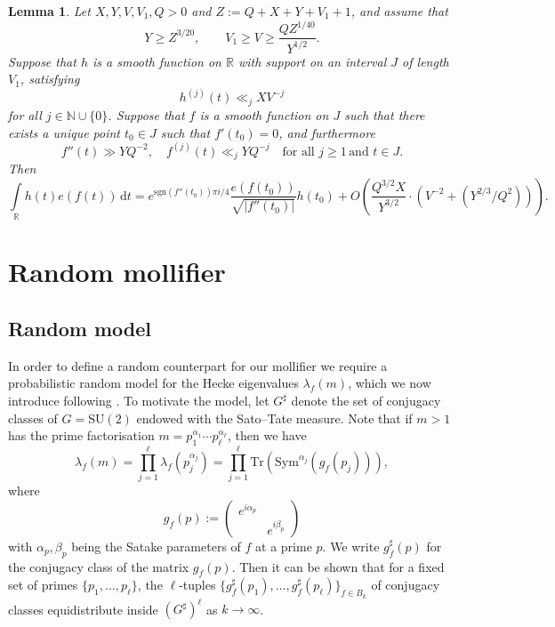 \documentclass[a4paper,10pt,twoside]{amsart}
\newtheorem{lemma}[theorem]{Lemma}
\theoremstyle{definition}
\numberwithin{equation}{section}
\newcommand\R{\mathbb{R}}
\renewcommand\:{\colon}
\begin{document}
\begin{lemma}\label{saddle-point}
Let $X,Y,V,V_1,Q>0$ and $Z:=Q+X+Y+V_1+1$, and assume that
\[Y\geq Z^{3/20}, \qquad V_1\geq V\geq\frac{QZ^{1/40}}{Y^{1/2}}.\]
Suppose that $h$ is a smooth function on $\mathbb R$ with support on an interval $J$ of length $V_1$, satisfying
\[h^{(j)}(t)\ll_j XV^{-j}\]
for all $j\in\mathbb N\cup\{0\}$. Suppose that $f$ is a smooth function on $J$ such that there exists a unique point $t_0\in J$ such that $f'(t_0)=0$, and furthermore 
\[f''(t)\gg YQ^{-2},\quad f^{(j)}(t)\ll_j YQ^{-j}\quad\text{for all }j\geq 1\,\text{and }t\in J.
\]
Then
\[\int\limits_{\mathbb R}h(t)e(f(t))\,\mathrm d t=e^{\text{sgn}(f''(t_0))\pi i/4}\frac{e(f(t_0))}{\sqrt{|f''(t_0)|}}h(t_0)+O\left(\frac{Q^{3/2}X}{Y^{3/2}}\cdot\left(V^{-2}+(Y^{2/3}/Q^2)\right)\right).\]
\end{lemma}

\section{Random mollifier}

\subsection{Random model}


\noindent In order to define a random counterpart for our mollifier we require a probabilistic random model for the Hecke eigenvalues $\lambda_f(m)$, which we now introduce following \cite{Lamzouri2019}. To motivate the model, let $G^\sharp$ denote the set of conjugacy classes of $G=\mathrm{SU}(2)$ endowed with the Sato--Tate measure. Note that if $m>1$ has the prime factorisation $m=p_1^{\alpha_1}\cdots p_\ell^{\alpha_\ell}$, then we have
\[ 
\lambda_f(m)=\prod_{j=1}^\ell\lambda_f\left(p_j^{\alpha_j}\right)=\prod_{j=1}^\ell\text{Tr}\left(\text{Sym}^{\alpha_j}(g_f(p_j))\right),\]
where 
\[ 
g_f(p):=\begin{pmatrix}
e^{i\alpha_p} & \\
& e^{i\beta_p}
\end{pmatrix}
\]
with $\alpha_p,\beta_p$ being the Satake parameters of $f$ at a prime $p$. We write $g_f^\sharp(p)$ for the conjugacy class of the matrix $g_f(p)$. Then it can be shown that for a fixed set of primes $\{p_1,...,p_\ell\}$, the $\ell$-tuples $\{g_f^\sharp(p_1),...,g_f^\sharp(p_\ell)\}_{f\in B_k}$ of conjugacy classes equidistribute inside $(G^\sharp)^\ell$ as $k\longrightarrow\infty$.
\end{document}
